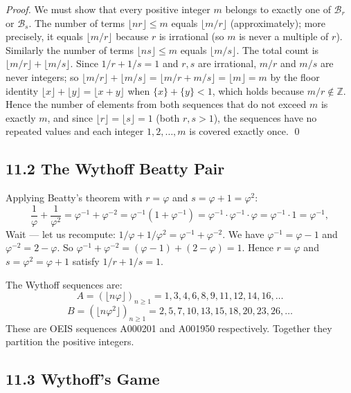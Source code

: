 \begin{proof}
We must show that every positive integer $m$ belongs
to exactly one of $\mathcal{B}_r$ or $\mathcal{B}_s$.
The number of terms $\lfloor nr \rfloor \leq m$ equals
$\lfloor m/r \rfloor$ (approximately); more precisely,
it equals $\lfloor m/r \rfloor$ because $r$ is irrational
(so $m$ is never a multiple of $r$).
Similarly the number of terms $\lfloor ns \rfloor \leq m$
equals $\lfloor m/s \rfloor$.
The total count is $\lfloor m/r \rfloor + \lfloor m/s \rfloor$.
Since $1/r + 1/s = 1$ and $r, s$ are irrational,
$m/r$ and $m/s$ are never integers; so
$\lfloor m/r \rfloor + \lfloor m/s \rfloor
= \lfloor m/r + m/s \rfloor = \lfloor m \rfloor = m$
by the floor identity $\lfloor x \rfloor + \lfloor y \rfloor
= \lfloor x+y \rfloor$ when $\{x\}+\{y\}<1$,
which holds because $m/r \notin \mathbb{Z}$.
Hence the number of elements from both sequences
that do not exceed $m$ is exactly $m$, and since
$\lfloor r \rfloor = \lfloor s \rfloor = 1$ (both
$r, s > 1$), the sequences have no repeated values
and each integer $1, 2, \ldots, m$ is covered
exactly once.
\qed
\end{proof}

\subsection{11.2 The Wythoff Beatty Pair}
\label{subsec:gc-wythoff-beatty}

Applying Beatty's theorem with $r = \varphi$ and
$s = \varphi + 1 = \varphi^2$:
\[
  \frac{1}{\varphi} + \frac{1}{\varphi^2}
  = \varphi^{-1} + \varphi^{-2}
  = \varphi^{-1}(1 + \varphi^{-1})
  = \varphi^{-1} \cdot \varphi^{-1} \cdot \varphi
  = \varphi^{-1} \cdot 1 = \varphi^{-1},
\]
Wait --- let us recompute: $1/\varphi + 1/\varphi^2
= \varphi^{-1} + \varphi^{-2}$.
We have $\varphi^{-1} = \varphi - 1$ and
$\varphi^{-2} = 2 - \varphi$.
So $\varphi^{-1} + \varphi^{-2} = (\varphi-1)+(2-\varphi) = 1$.
Hence $r = \varphi$ and $s = \varphi^2 = \varphi+1$ satisfy
$1/r + 1/s = 1$.

The Wythoff sequences are:
\[
  A = (\lfloor n\varphi \rfloor)_{n\geq 1}
    = 1, 3, 4, 6, 8, 9, 11, 12, 14, 16, \ldots
\]
\[
  B = (\lfloor n\varphi^2 \rfloor)_{n\geq 1}
    = 2, 5, 7, 10, 13, 15, 18, 20, 23, 26, \ldots
\]
These are OEIS sequences A000201 and A001950 respectively.
Together they partition the positive integers.

\subsection{11.3 Wythoff's Game}
\label{subsec:gc-wythoff-game}

